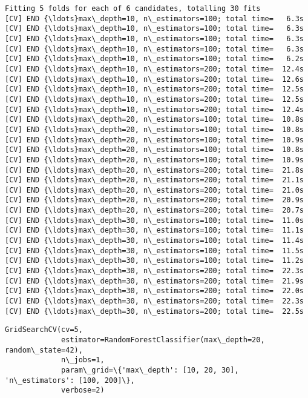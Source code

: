 \documentclass[11pt]{article}
\makeatletter
\newcommand{\boxspacing}{\kern\kvtcb@left@rule\kern\kvtcb@boxsep}
\newcommand{\prompt}[4]{
        {\ttfamily\llap{{\color{#2}[#3]:\hspace{3pt}#4}}\vspace{-\baselineskip}}
    }
\makeatother
\begin{document}
    \begin{Verbatim}[commandchars=\\\{\}]
Fitting 5 folds for each of 6 candidates, totalling 30 fits
[CV] END {\ldots}max\_depth=10, n\_estimators=100; total time=   6.3s
[CV] END {\ldots}max\_depth=10, n\_estimators=100; total time=   6.3s
[CV] END {\ldots}max\_depth=10, n\_estimators=100; total time=   6.3s
[CV] END {\ldots}max\_depth=10, n\_estimators=100; total time=   6.3s
[CV] END {\ldots}max\_depth=10, n\_estimators=100; total time=   6.2s
[CV] END {\ldots}max\_depth=10, n\_estimators=200; total time=  12.4s
[CV] END {\ldots}max\_depth=10, n\_estimators=200; total time=  12.6s
[CV] END {\ldots}max\_depth=10, n\_estimators=200; total time=  12.5s
[CV] END {\ldots}max\_depth=10, n\_estimators=200; total time=  12.5s
[CV] END {\ldots}max\_depth=10, n\_estimators=200; total time=  12.4s
[CV] END {\ldots}max\_depth=20, n\_estimators=100; total time=  10.8s
[CV] END {\ldots}max\_depth=20, n\_estimators=100; total time=  10.8s
[CV] END {\ldots}max\_depth=20, n\_estimators=100; total time=  10.9s
[CV] END {\ldots}max\_depth=20, n\_estimators=100; total time=  10.8s
[CV] END {\ldots}max\_depth=20, n\_estimators=100; total time=  10.9s
[CV] END {\ldots}max\_depth=20, n\_estimators=200; total time=  21.8s
[CV] END {\ldots}max\_depth=20, n\_estimators=200; total time=  21.1s
[CV] END {\ldots}max\_depth=20, n\_estimators=200; total time=  21.0s
[CV] END {\ldots}max\_depth=20, n\_estimators=200; total time=  20.9s
[CV] END {\ldots}max\_depth=20, n\_estimators=200; total time=  20.7s
[CV] END {\ldots}max\_depth=30, n\_estimators=100; total time=  11.0s
[CV] END {\ldots}max\_depth=30, n\_estimators=100; total time=  11.1s
[CV] END {\ldots}max\_depth=30, n\_estimators=100; total time=  11.4s
[CV] END {\ldots}max\_depth=30, n\_estimators=100; total time=  11.5s
[CV] END {\ldots}max\_depth=30, n\_estimators=100; total time=  11.2s
[CV] END {\ldots}max\_depth=30, n\_estimators=200; total time=  22.3s
[CV] END {\ldots}max\_depth=30, n\_estimators=200; total time=  21.9s
[CV] END {\ldots}max\_depth=30, n\_estimators=200; total time=  22.0s
[CV] END {\ldots}max\_depth=30, n\_estimators=200; total time=  22.3s
[CV] END {\ldots}max\_depth=30, n\_estimators=200; total time=  22.5s
    \end{Verbatim}

            \begin{tcolorbox}[breakable, size=fbox, boxrule=.5pt, pad at break*=1mm, opacityfill=0]
\prompt{Out}{outcolor}{38}{\boxspacing}
\begin{Verbatim}[commandchars=\\\{\}]
GridSearchCV(cv=5,
             estimator=RandomForestClassifier(max\_depth=20, random\_state=42),
             n\_jobs=1,
             param\_grid=\{'max\_depth': [10, 20, 30], 'n\_estimators': [100, 200]\},
             verbose=2)
\end{Verbatim}
\end{tcolorbox}
        
\end{document}
